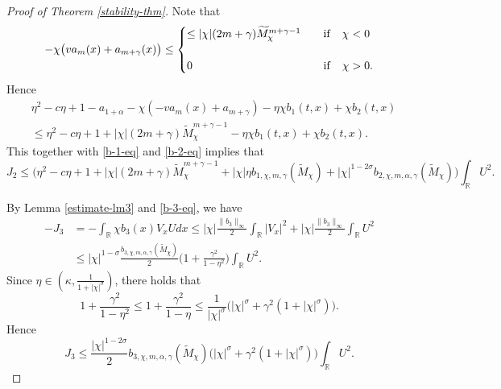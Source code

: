 \documentclass[11pt]{article} %
\theoremstyle{remark}
\theoremstyle{remark}
\numberwithin{equation}{section}
\numberwithin{figure}{section}
\numberwithin{table}{section}
\newcommand\RR{\ensuremath{\mathbb{R}}}
\begin{document}
\begin{proof}[Proof of Theorem \ref{stability-thm}]
Note that  
$$
-\chi\big(v a_m(x)+a_{m+\gamma}(x)\big)\le \begin{cases} \le |\chi|(2m+\gamma) \widetilde M_{\chi}^{m+\gamma-1}  \quad &{\rm if}\quad \chi<0\cr\cr
0\quad &{\rm if}\quad \chi>0.
\end{cases}
$$
Hence
\begin{align*}
&\eta^2-c\eta+1-a_{1+\alpha}  -\chi( - v a_m(x)  + a_{m+\gamma})-\eta\chi  b_1(t,x) +\chi b_2(t,x)\\
&\le \eta^2 -c\eta +1+|\chi| (2m+\gamma)\widetilde M_{\chi}^{m+\gamma-1}-\eta\chi  b_1(t,x) +\chi b_2(t,x).
\end{align*}
This  together with \eqref{b-1-eq} and \eqref{b-2-eq} implies that
\begin{equation}
\label{J-2-eq}
J_2\le \Big ( \eta^2 -c\eta +1+|\chi| (2m+\gamma)\widetilde M_\chi^{m+\gamma-1}+ |\chi| \eta  b_{1,\chi,m,\gamma} (\widetilde M_\chi)  +|\chi|^{1-2\sigma}  b_{2,\chi,m,\alpha,\gamma}(\widetilde M_\chi)\Big) \int_{\RR}  U^2.
\end{equation}


\smallskip

 By Lemma \ref{estimate-lm3} and \eqref{b-3-eq}, we have
\begin{align*}
-J_3&=-\int_{\RR} \chi b_3(x) V_xUdx\le |\chi| \frac{\|b_3\|_\infty }{2}\int_{\RR} |V_x|^2 +|\chi| \frac{\|b_3\|_\infty }{2}\int_{\RR}  U^2\\
&\le |\chi|^{1-\sigma} \frac{b_{3,\chi,m,\alpha,\gamma}(\widetilde M_\chi)}{2}\Big(1+\frac{\gamma^2}{1-\eta^2}\Big)\int_{\RR} U^2.
\end{align*}
 Since $\eta\in(\kappa,\frac{1}{1+|\chi|^\sigma})$, there holds that
$$
1+\frac{\gamma^2 }{1-\eta^2}\le 1+\frac{\gamma^2}{1-\eta}\le \frac{1}{|\chi|^\sigma}\big(|\chi|^\sigma +\gamma^2 (1+|\chi|^\sigma)\big).
$$
Hence
\begin{equation}
\label{J-3-eq}
J_3\le \frac{ |\chi|^{1-2\sigma} }{2}  b_{3,\chi,m,\alpha,\gamma} (\widetilde M_\chi)\big(|\chi|^\sigma +\gamma^2 (1+|\chi|^\sigma)\big) \int_{\RR} U^2.
\end{equation}

\smallskip


\end{proof}
\end{document}

